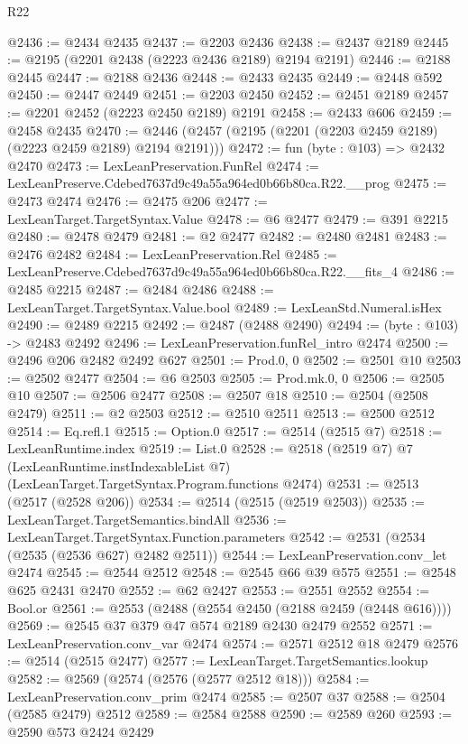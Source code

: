 \begin{lexlean}{R22}
\begin{coremodule}
@2436 := @2434 @2435
@2437 := @2203 @2436
@2438 := @2437 @2189
@2445 := @2195 (@2201 @2438 (@2223 @2436 @2189) @2194 @2191)
@2446 := @2188 @2445
@2447 := @2188 @2436
@2448 := @2433 @2435
@2449 := @2448 @592
@2450 := @2447 @2449
@2451 := @2203 @2450
@2452 := @2451 @2189
@2457 := @2201 @2452 (@2223 @2450 @2189) @2191
@2458 := @2433 @606
@2459 := @2458 @2435
@2470 := @2446 (@2457 (@2195 (@2201 (@2203 @2459 @2189) (@2223 @2459 @2189) @2194 @2191)))
@2472 := fun (byte : @103) => @2432 @2470
@2473 := LexLeanPreservation.FunRel
@2474 := LexLeanPreserve.Cdebed7637d9c49a55a964ed0b66b80ca.R22.__prog
@2475 := @2473 @2474
@2476 := @2475 @206
@2477 := LexLeanTarget.TargetSyntax.Value
@2478 := @6 @2477
@2479 := @391 @2215
@2480 := @2478 @2479
@2481 := @2 @2477
@2482 := @2480 @2481
@2483 := @2476 @2482
@2484 := LexLeanPreservation.Rel
@2485 := LexLeanPreserve.Cdebed7637d9c49a55a964ed0b66b80ca.R22.__fits_4
@2486 := @2485 @2215
@2487 := @2484 @2486
@2488 := LexLeanTarget.TargetSyntax.Value.bool
@2489 := LexLeanStd.Numeral.isHex
@2490 := @2489 @2215
@2492 := @2487 (@2488 @2490)
@2494 := (byte : @103) -> @2483 @2492
@2496 := LexLeanPreservation.funRel_intro @2474
@2500 := @2496 @206 @2482 @2492 @627
@2501 := Prod.{0, 0}
@2502 := @2501 @10
@2503 := @2502 @2477
@2504 := @6 @2503
@2505 := Prod.mk.{0, 0}
@2506 := @2505 @10
@2507 := @2506 @2477
@2508 := @2507 @18
@2510 := @2504 (@2508 @2479)
@2511 := @2 @2503
@2512 := @2510 @2511
@2513 := @2500 @2512
@2514 := Eq.refl.{1}
@2515 := Option.{0}
@2517 := @2514 (@2515 @7)
@2518 := LexLeanRuntime.index
@2519 := List.{0}
@2528 := @2518
    (@2519 @7)
    @7
    (LexLeanRuntime.instIndexableList @7)
    (LexLeanTarget.TargetSyntax.Program.functions @2474)
@2531 := @2513 (@2517 (@2528 @206))
@2534 := @2514 (@2515 (@2519 @2503))
@2535 := LexLeanTarget.TargetSemantics.bindAll
@2536 := LexLeanTarget.TargetSyntax.Function.parameters
@2542 := @2531 (@2534 (@2535 (@2536 @627) @2482 @2511))
@2544 := LexLeanPreservation.conv_let @2474
@2545 := @2544 @2512
@2548 := @2545 @66 @39 @575
@2551 := @2548 @625 @2431 @2470
@2552 := @62 @2427
@2553 := @2551 @2552
@2554 := Bool.or
@2561 := @2553 (@2488 (@2554 @2450 (@2188 @2459 (@2448 @616))))
@2569 := @2545 @37 @379 @47 @574 @2189 @2430 @2479 @2552
@2571 := LexLeanPreservation.conv_var @2474
@2574 := @2571 @2512 @18 @2479
@2576 := @2514 (@2515 @2477)
@2577 := LexLeanTarget.TargetSemantics.lookup
@2582 := @2569 (@2574 (@2576 (@2577 @2512 @18)))
@2584 := LexLeanPreservation.conv_prim @2474
@2585 := @2507 @37
@2588 := @2504 (@2585 @2479) @2512
@2589 := @2584 @2588
@2590 := @2589 @260
@2593 := @2590 @573 @2424 @2429

\end{coremodule}
\end{lexlean}
